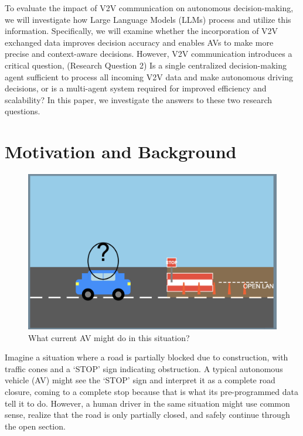 \documentclass[conference]{IEEEtran}
\begin{document}
To evaluate the impact of V2V communication on autonomous decision-making, we will investigate how Large Language Models (LLMs) process and utilize this information. Specifically, we will examine whether the incorporation of V2V exchanged data improves decision accuracy and enables AVs to make more precise and context-aware decisions.
However, V2V communication introduces a critical question, (Research Question 2) Is a single centralized decision-making agent sufficient to process all incoming V2V data and make autonomous driving decisions, or is a multi-agent system required for improved efficiency and scalability? In this paper, we investigate the answers to these two research questions. 



\section{Motivation and Background}
\begin{figure}[ht]
    \centering
    \includegraphics[width= \linewidth]{situation1.png}
    \caption{What current AV might do in this situation?}
    \label{fig:enter-label-unique}
\end{figure}
Imagine a situation where a road is partially blocked due to construction, with traffic cones and a `STOP' sign indicating obstruction. A typical autonomous vehicle (AV) might see the `STOP' sign and interpret it as a complete road closure, coming to a complete stop because that is what its pre-programmed data tell it to do. However, a human driver in the same situation might use common sense, realize that the road is only partially closed, and safely continue through the open section.
\end{document}
